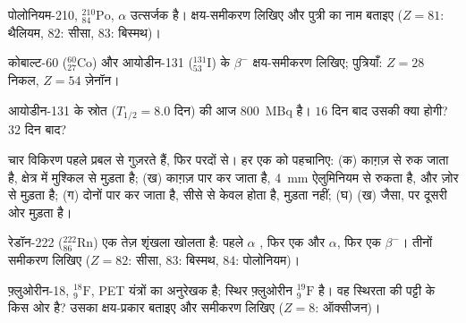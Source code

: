 \begin{exercise}[$\star$]\label{exo:g11:nucleus-radioactivity:3}
पोलोनियम-210, ${}^{210}_{84}\mathrm{Po}$, $\alpha$ उत्सर्जक है। क्षय-समीकरण लिखिए और पुत्री का
नाम बताइए ($Z = 81$: थैलियम, $82$: सीसा, $83$: बिस्मथ)।
\end{exercise}

\begin{exercise}[$\star$]\label{exo:g11:nucleus-radioactivity:4}
कोबाल्ट-60 (${}^{60}_{27}\mathrm{Co}$) और आयोडीन-131 (${}^{131}_{53}\mathrm{I}$) के $\beta^-$ क्षय-समीकरण लिखिए;
पुत्रियाँ: $Z = 28$ निकल, $Z = 54$ ज़ेनॉन।
\end{exercise}

\begin{exercise}[$\star$]\label{exo:g11:nucleus-radioactivity:5}
आयोडीन-131 के स्रोत ($T_{1/2} = 8.0$ दिन) की  आज \qty{800}{MBq} है।
$16$ दिन बाद उसकी  क्या होगी? $32$ दिन बाद?
\end{exercise}

\begin{exercise}[$\star\star$]\label{exo:g11:nucleus-radioactivity:6}
चार विकिरण पहले प्रबल  से गुज़रते हैं, फिर परदों से।
हर एक को पहचानिए: (क) काग़ज़ से रुक जाता है, क्षेत्र में मुश्किल से
मुड़ता है; (ख) काग़ज़ पार कर जाता है, \qty{4}{mm} ऐलुमिनियम से रुकता है, और
ज़ोर से मुड़ता है; (ग) दोनों पार कर जाता है, सीसे से केवल 
होता है, मुड़ता नहीं; (घ) (ख) जैसा, पर दूसरी ओर मुड़ता है।
\end{exercise}

\begin{exercise}[$\star\star$]\label{exo:g11:nucleus-radioactivity:7}
रेडॉन-222 (${}^{222}_{86}\mathrm{Rn}$) एक तेज़ शृंखला खोलता है: पहले $\alpha$ , फिर एक और
$\alpha$, फिर एक $\beta^-$। तीनों समीकरण लिखिए ($Z = 82$: सीसा, $83$: बिस्मथ,
$84$: पोलोनियम)।
\end{exercise}

\begin{exercise}[$\star\star$]\label{exo:g11:nucleus-radioactivity:8}
फ़्लुओरीन-18, ${}^{18}_{9}\mathrm{F}$, PET यंत्रों का अनुरेखक है; स्थिर फ़्लुओरीन ${}^{19}_{9}\mathrm{F}$ है।
वह स्थिरता की पट्टी के किस ओर है? उसका क्षय-प्रकार बताइए और समीकरण लिखिए
($Z = 8$: ऑक्सीजन)।
\end{exercise}

